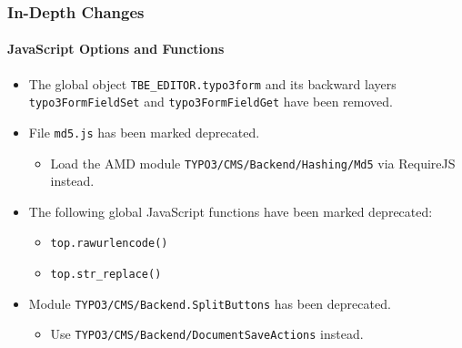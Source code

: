 \begin{frame}[fragile]
	\frametitle{In-Depth Changes}
	\framesubtitle{JavaScript Options and Functions}

	\begin{itemize}

		\item The global object \texttt{TBE\_EDITOR.typo3form} and its backward layers \texttt{typo3FormFieldSet}
			and \texttt{typo3FormFieldGet} have been removed.

		\item File \texttt{md5.js} has been marked deprecated.

			\begin{itemize}\smaller
				\item[\ding{228}] Load the AMD module \texttt{TYPO3/CMS/Backend/Hashing/Md5} via RequireJS instead.
			\end{itemize}\normalsize

		\item The following global JavaScript functions have been marked deprecated:

		\begin{itemize}
			\item \texttt{top.rawurlencode()}
			\item \texttt{top.str\_replace()}
		\end{itemize}

		\item Module \texttt{TYPO3/CMS/Backend.SplitButtons} has been deprecated.

			\begin{itemize}\smaller
				\item[\ding{228}] Use \texttt{TYPO3/CMS/Backend/DocumentSaveActions} instead.
			\end{itemize}\normalsize

 	\end{itemize}

\end{frame}


